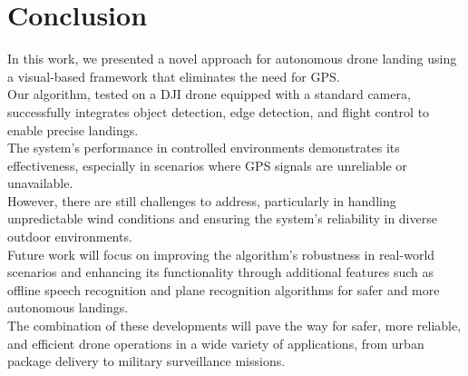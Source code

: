 \documentclass[unnumsec,webpdf,modern,large]{mam-authoring-template}%
\begin{document}
\section{Conclusion}
In this work, we presented a novel approach for autonomous drone landing using a visual-based framework that eliminates the need for GPS.\\
Our algorithm, tested on a DJI drone equipped with a standard camera, successfully integrates object detection, edge detection, and flight control to enable precise landings. \\
The system's performance in controlled environments demonstrates its effectiveness, especially in scenarios where GPS signals are unreliable or unavailable.\\
However, there are still challenges to address, particularly in handling unpredictable wind conditions and ensuring the system’s reliability in diverse outdoor environments.\\
Future work will focus on improving the algorithm’s robustness in real-world scenarios and enhancing its functionality through additional features such as offline speech recognition and plane recognition algorithms for safer and more autonomous landings.\\
The combination of these developments will pave the way for safer, more reliable, and efficient drone operations in a wide variety of applications, from urban package delivery to military surveillance missions.


       
\end{document}
